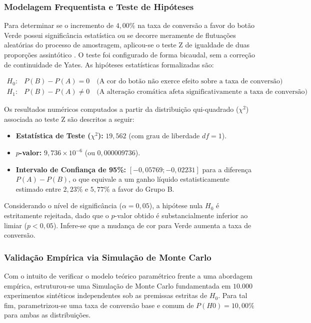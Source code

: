 \subsubsection{Modelagem Frequentista e Teste de Hipóteses}

Para determinar se o incremento de $4,00\%$ na taxa de conversão a favor do botão Verde possui significância estatística ou se decorre meramente de flutuações aleatórias do processo de amostragem, aplicou-se o teste Z de igualdade de duas proporções assintótico \cite{montgomery2018applied}. O teste foi configurado de forma bicaudal, sem a correção de continuidade de Yates. As hipóteses estatísticas formalizadas são:

\begin{align*}
	H_0: &P(B) - P(A) = 0 \quad \text{(A cor do botão não exerce efeito sobre a taxa de conversão)} \\
	H_1: &P(B) - P(A) \neq 0 \quad \text{(A alteração cromática afeta significativamente a taxa de conversão)}
\end{align*}

Os resultados numéricos computados a partir da distribuição qui-quadrado ($\chi^2$) associada ao teste Z são descritos a seguir:
\begin{itemize}
	\item \textbf{Estatística de Teste ($\chi^2$):} $19,562$ (com grau de liberdade $df = 1$).
	\item \textbf{$p$-valor:} $9,736 \times 10^{-6}$ (ou $0,000009736$).
	\item \textbf{Intervalo de Confiança de 95\%:} $[-0,05769; -0,02231]$ para a diferença $P(A) - P(B)$, o que equivale a um ganho líquido estatisticamente estimado entre $2,23\%$ e $5,77\%$ a favor do Grupo B.
\end{itemize}

Considerando o nível de significância ($\alpha = 0,05$), a hipótese nula $H_0$ é estritamente rejeitada, dado que o $p$-valor obtido é substancialmente inferior ao limiar ($p < 0,05$). Infere-se que a mudança de cor para Verde aumenta a taxa de conversão.

\subsubsection{Validação Empírica via Simulação de Monte Carlo}

Com o intuito de verificar o modelo teórico paramétrico frente a uma abordagem empírica, estruturou-se uma Simulação de Monte Carlo fundamentada em $10.000$ experimentos sintéticos independentes sob as premissas estritas de $H_0$. Para tal fim, parametrizou-se uma taxa de conversão base e comum de $P(H0) = 10,00\%$ para ambas as distribuições.

